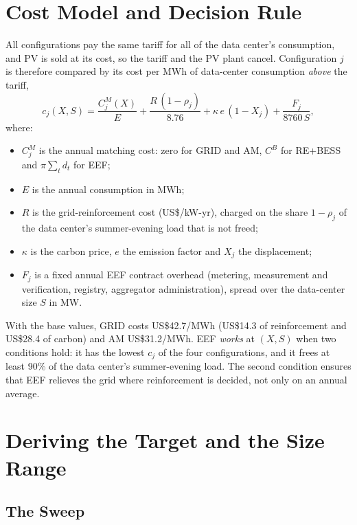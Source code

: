 \section{Cost Model and Decision Rule}\label{sec:3-6}

All configurations pay the same tariff for all of the data center's consumption, and PV is sold at its cost, so the tariff and the PV plant cancel. Configuration $j$ is therefore compared by its cost per MWh of data-center consumption \emph{above} the tariff,
\begin{equation}
c_j(X,S)=\frac{C^M_j(X)}{E}+\frac{R\,(1-\rho_j)}{8.76}+\kappa\,e\,(1-X_j)+\frac{F_j}{8760\,S},
\label{eq:3-unitcost}
\end{equation}
where:
\begin{itemize}
\item $C^M_j$ is the annual matching cost: zero for GRID and AM, $C^B$ for RE+BESS and $\pi\sum_t d_t$ for EEF;
\item $E$ is the annual consumption in MWh;
\item $R$ is the grid-reinforcement cost (US\$/kW-yr), charged on the share $1-\rho_j$ of the data center's summer-evening load that is not freed;
\item $\kappa$ is the carbon price, $e$ the emission factor and $X_j$ the displacement;
\item $F_j$ is a fixed annual EEF contract overhead (metering, measurement and verification, registry, aggregator administration), spread over the data-center size $S$ in MW.
\end{itemize}

With the base values, GRID costs US\$42.7/MWh (US\$14.3 of reinforcement and US\$28.4 of carbon) and AM US\$31.2/MWh. EEF \emph{works} at $(X,S)$ when two conditions hold: it has the lowest $c_j$ of the four configurations, and it frees at least 90\% of the data center's summer-evening load. The second condition ensures that EEF relieves the grid where reinforcement is decided, not only on an annual average.

\section{Deriving the Target and the Size Range}\label{sec:3-7}

\subsection{The Sweep}

